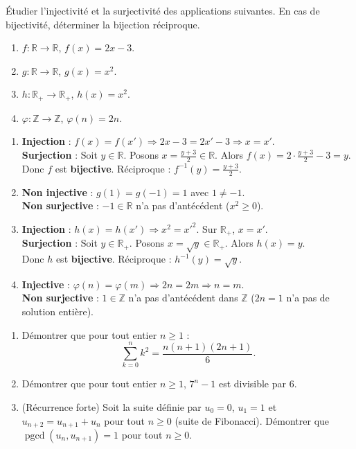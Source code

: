 \documentclass[11pt,a4paper,twoside]{book}
\newcommand{\Z}{\mathbb{Z}}
\newcommand{\R}{\mathbb{R}}
\DeclareMathOperator{\pgcd}{pgcd}
\begin{document}
\begin{exercicebox}
Étudier l'injectivité et la surjectivité des applications suivantes. En cas de bijectivité,
déterminer la bijection réciproque.
\begin{enumerate}
  \item $f : \R \to \R$, $f(x) = 2x - 3$.
  \item $g : \R \to \R$, $g(x) = x^2$.
  \item $h : \R_+ \to \R_+$, $h(x) = x^2$.
  \item $\varphi : \Z \to \Z$, $\varphi(n) = 2n$.
\end{enumerate}
\end{exercicebox}

\begin{correctionbox}
\begin{enumerate}
  \item \textbf{Injection} : $f(x) = f(x') \Rightarrow 2x-3 = 2x'-3 \Rightarrow x = x'$. \\
        \textbf{Surjection} : Soit $y \in \R$. Posons $x = \frac{y+3}{2} \in \R$. Alors
        $f(x) = 2\cdot\frac{y+3}{2} - 3 = y$. \\
        Donc $f$ est \textbf{bijective}. Réciproque : $f^{-1}(y) = \frac{y+3}{2}$.

  \item \textbf{Non injective} : $g(1) = g(-1) = 1$ avec $1 \neq -1$. \\
        \textbf{Non surjective} : $-1 \in \R$ n'a pas d'antécédent ($x^2 \geq 0$).

  \item \textbf{Injection} : $h(x) = h(x') \Rightarrow x^2 = x'^2$. Sur $\R_+$, $x = x'$.\\
        \textbf{Surjection} : Soit $y \in \R_+$. Posons $x = \sqrt{y} \in \R_+$.
        Alors $h(x) = y$. \\
        Donc $h$ est \textbf{bijective}. Réciproque : $h^{-1}(y) = \sqrt{y}$.

  \item \textbf{Injective} : $\varphi(n) = \varphi(m) \Rightarrow 2n = 2m \Rightarrow n = m$.\\
        \textbf{Non surjective} : $1 \in \Z$ n'a pas d'antécédent dans $\Z$ ($2n = 1$
        n'a pas de solution entière).
\end{enumerate}
\end{correctionbox}

\begin{exercicebox}
\begin{enumerate}
  \item Démontrer que pour tout entier $n \geq 1$ :
  \[
    \sum_{k=0}^{n} k^2 = \frac{n(n+1)(2n+1)}{6}.
  \]
  \item Démontrer que pour tout entier $n \geq 1$, $7^n - 1$ est divisible par $6$.
  \item (Récurrence forte) Soit la suite définie par $u_0 = 0$, $u_1 = 1$ et
        $u_{n+2} = u_{n+1} + u_n$ pour tout $n \geq 0$ (suite de Fibonacci).
        Démontrer que $\pgcd(u_n, u_{n+1}) = 1$ pour tout $n \geq 0$.
\end{enumerate}
\end{exercicebox}
\end{document}
